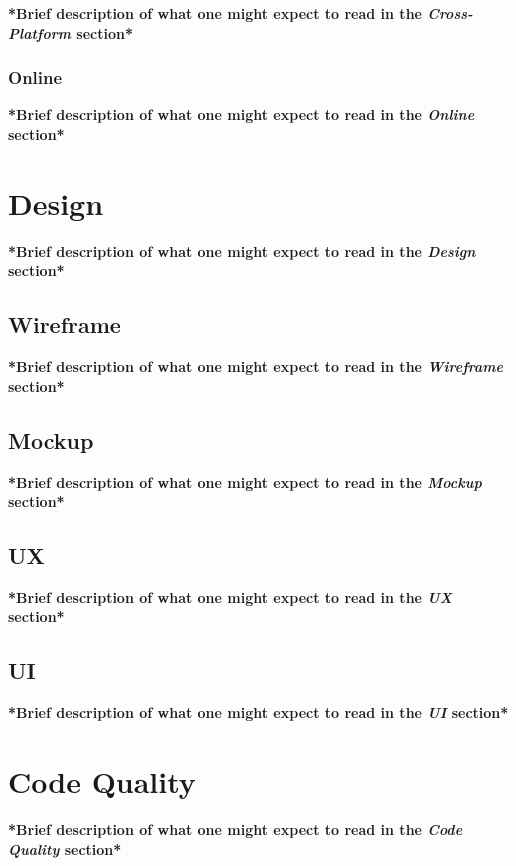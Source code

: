 \textbf{*Brief description of what one might expect to read in the \textit{Cross-Platform} section*}

\subsubsection*{Online}

\textbf{*Brief description of what one might expect to read in the \textit{Online} section*}

\section{Design}

\textbf{*Brief description of what one might expect to read in the \textit{Design} section*}

\subsection{Wireframe}

\textbf{*Brief description of what one might expect to read in the \textit{Wireframe} section*}

\subsection{Mockup}

\textbf{*Brief description of what one might expect to read in the \textit{Mockup} section*}

\subsection{UX}

\textbf{*Brief description of what one might expect to read in the \textit{UX} section*}

\subsection{UI}

\textbf{*Brief description of what one might expect to read in the \textit{UI} section*}

\section{Code Quality}

\textbf{*Brief description of what one might expect to read in the \textit{Code Quality} section*}

